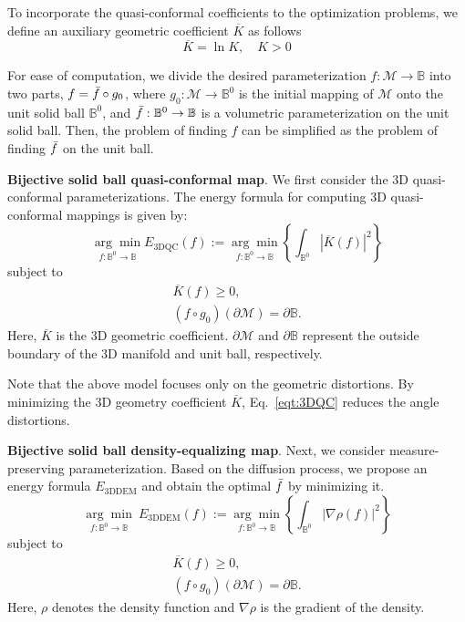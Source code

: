 \documentclass{article}
\begin{document}
To incorporate the quasi-conformal coefficients to the optimization problems, we define an auxiliary geometric coefficient $\overline{K}$ as follows
\begin{equation*}
    \overline{K} = \ln{K}, \quad K>0
\end{equation*}

For ease of computation, we divide the desired parameterization $f:\mathcal{M} \rightarrow \mathbb B$ into two parts, $f = \Bar{f} \circ g_0$, where $g_0: \mathcal{M} \rightarrow \mathbb B^0$ is the initial mapping of $\mathcal{M}$ onto the unit solid ball $\mathbb B^0$, and $\Bar{f}:\mathbb B^0 \rightarrow \mathbb B$ is a volumetric parameterization on the unit solid ball. Then, the problem of finding $f$ can be simplified as the problem of finding $\Bar{f}$ on the unit ball.

\textbf{Bijective solid ball quasi-conformal map}. We first consider the 3D quasi-conformal parameterizations. The energy formula for computing 3D quasi-conformal mappings is given by:
\begin{equation}\label{eqt:3DQC}
    \underset{f: \mathbb B^0 \rightarrow \mathbb B}{\arg \min } E_{\text{3DQC}}(f):=\underset{f: \mathbb B^0 \rightarrow \mathbb B}{\arg \min }\left\{\int_{\mathbb B^0} |\overline{K}(f) |^2\right\}
\end{equation}
subject to
\begin{align}
    \overline{K}\left(f\right)  \geq 0, \\
    \left(f \circ g_0 \right) \left( \partial \mathcal{M} \right) = \partial \mathbb B.
\end{align}
Here, $\overline{K}$ is the 3D geometric coefficient. $\partial \mathcal{M}$ and $\partial \mathbb B$ represent the outside boundary of the 3D manifold and unit ball, respectively.

Note that the above model focuses only on the geometric distortions. By minimizing the 3D geometry coefficient $\overline{K}$, Eq.~\eqref{eqt:3DQC} reduces the angle distortions.

\textbf{Bijective solid ball density-equalizing map}. Next, we consider measure-preserving parameterization. Based on the diffusion process, we propose an energy formula $E_{\text{3DDEM}}$ and obtain the optimal $\Bar{f}$ by minimizing it.
\begin{equation}\label{eqt:3DDEM}
    \underset{f: \mathbb B^0 \rightarrow \mathbb B}{\arg \min } \ E_{\text{3DDEM}}(f):=\underset{f: \mathbb B^0 \rightarrow \mathbb B}{\arg \min }\left\{\int_{\mathbb B^0} |\nabla \rho(f) |^2\right\}
\end{equation}
subject to
\begin{align}
    \overline{K}\left(f\right) \geq 0, \\
    \left(f \circ g_0 \right) \left( \partial \mathcal{M} \right) = \partial \mathbb B.
\end{align}
Here, $\rho$ denotes the density function and $\nabla \rho$ is the gradient of the density.
\end{document}

